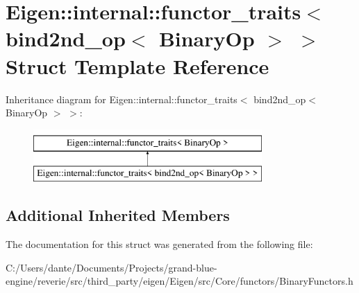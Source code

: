 \hypertarget{struct_eigen_1_1internal_1_1functor__traits_3_01bind2nd__op_3_01_binary_op_01_4_01_4}{}\section{Eigen\+::internal\+::functor\+\_\+traits$<$ bind2nd\+\_\+op$<$ Binary\+Op $>$ $>$ Struct Template Reference}
\label{struct_eigen_1_1internal_1_1functor__traits_3_01bind2nd__op_3_01_binary_op_01_4_01_4}
Inheritance diagram for Eigen\+::internal\+::functor\+\_\+traits$<$ bind2nd\+\_\+op$<$ Binary\+Op $>$ $>$\+:\begin{figure}[H]
\begin{center}
\leavevmode
\includegraphics[height=2.000000cm]{struct_eigen_1_1internal_1_1functor__traits_3_01bind2nd__op_3_01_binary_op_01_4_01_4}
\end{center}
\end{figure}
\subsection*{Additional Inherited Members}


The documentation for this struct was generated from the following file\+:\begin{DoxyCompactItemize}
\item 
C\+:/\+Users/dante/\+Documents/\+Projects/grand-\/blue-\/engine/reverie/src/third\+\_\+party/eigen/\+Eigen/src/\+Core/functors/Binary\+Functors.\+h\end{DoxyCompactItemize}

